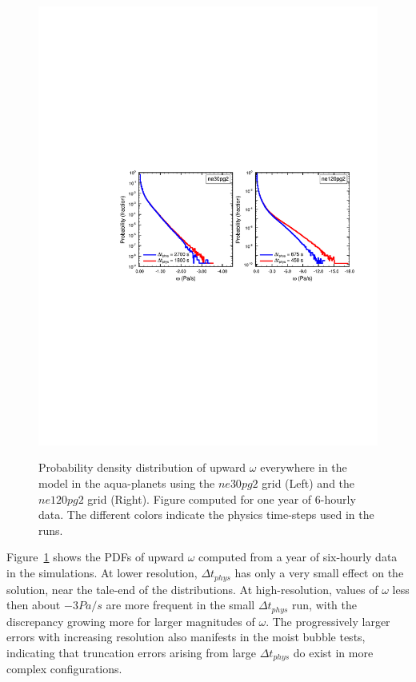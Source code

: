 \documentclass[draft,linenumbers]{agujournal}
\begin{document}
\begin{figure}[t]
\begin{center}
\noindent\includegraphics[width=30pc,angle=0]{panel_pdf_dtphys.pdf}\\
\end{center}
\caption{Probability density distribution of upward $\omega$ everywhere in the model in the aqua-planets using the $ne30pg2$ grid (Left) and the $ne120pg2$ grid (Right). Figure computed for one year of 6-hourly data. The different colors indicate the physics time-steps used in the runs.}
\label{fig:pdf-dtphys}
\end{figure}

Figure~\ref{fig:pdf-dtphys} shows the PDFs of upward $\omega$ computed from a year of six-hourly data in the simulations. At lower resolution, $\Delta t_{phys}$ has only a very small effect on the solution, near the tale-end of the distributions. At high-resolution, values of $\omega$ less then about $-3 Pa/s$ are more frequent in the small $\Delta t_{phys}$ run, with the discrepancy growing more for larger magnitudes of $\omega$. The progressively larger errors with increasing resolution also manifests in the moist bubble tests, indicating that truncation errors arising from large $\Delta t_{phys}$ do exist in more complex configurations.
\end{document}
